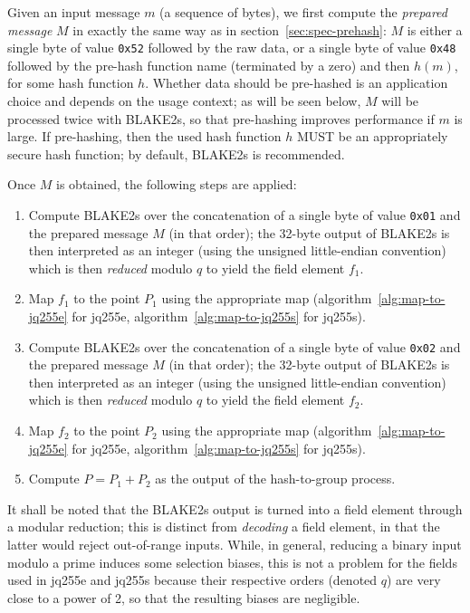 \documentclass{llncs}
\begin{document}
Given an input message $m$ (a sequence of bytes), we first compute the
\emph{prepared message} $M$ in exactly the same way as in
section~\ref{sec:spec-prehash}: $M$ is either a single byte of value
\verb+0x52+ followed by the raw data, or a single byte of value
\verb+0x48+ followed by the pre-hash function name (terminated by a
zero) and then $h(m)$, for some hash function $h$. Whether data should
be pre-hashed is an application choice and depends on the usage context;
as will be seen below, $M$ will be processed twice with BLAKE2s, so that
pre-hashing improves performance if $m$ is large. If pre-hashing, then
the used hash function $h$ MUST be an appropriately secure hash
function; by default, BLAKE2s is recommended.

Once $M$ is obtained, the following steps are applied:
\begin{enumerate}

    \item Compute BLAKE2s over the concatenation of a single byte of
    value \verb+0x01+ and the prepared message $M$ (in that order);
    the 32-byte output of BLAKE2s is then interpreted as an integer
    (using the unsigned little-endian convention) which is then
    \emph{reduced} modulo $q$ to yield the field element $f_1$.

    \item Map $f_1$ to the point $P_1$ using the appropriate map
    (algorithm~\ref{alg:map-to-jq255e} for jq255e,
    algorithm~\ref{alg:map-to-jq255s} for jq255s).

    \item Compute BLAKE2s over the concatenation of a single byte of
    value \verb+0x02+ and the prepared message $M$ (in that order);
    the 32-byte output of BLAKE2s is then interpreted as an integer
    (using the unsigned little-endian convention) which is then
    \emph{reduced} modulo $q$ to yield the field element $f_2$.

    \item Map $f_2$ to the point $P_2$ using the appropriate map
    (algorithm~\ref{alg:map-to-jq255e} for jq255e,
    algorithm~\ref{alg:map-to-jq255s} for jq255s).

    \item Compute $P = P_1 + P_2$ as the output of the hash-to-group
    process.

\end{enumerate}

It shall be noted that the BLAKE2s output is turned into a field element
through a modular reduction; this is distinct from \emph{decoding} a
field element, in that the latter would reject out-of-range inputs.
While, in general, reducing a binary input modulo a prime induces some
selection biases, this is not a problem for the fields used in jq255e
and jq255s because their respective orders (denoted $q$) are very close
to a power of 2, so that the resulting biases are negligible.
\end{document}
